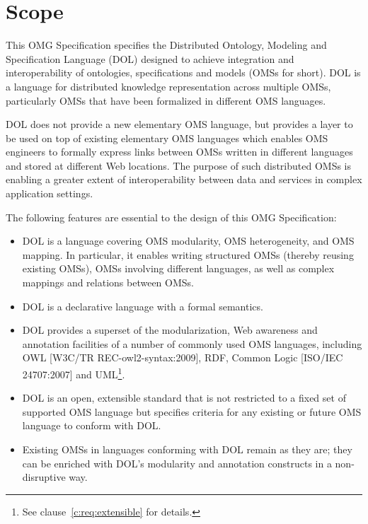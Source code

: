\documentclass[10pt,%
\ifpretendfinal
final%
\else
draft%
\fi,
]{scrreprt}
\newcommand*{\nitem}[1]{[#1]}
\newcommand*{\IS}{OMG Specification\xspace}
\newcommand{\clauserefname}{clause}
\newcommand{\cref}[1]{\clauserefname~\ref{#1}}
\begin{document}
\chapter{Scope}
This \IS specifies the Distributed Ontology, Modeling and Specification Language (DOL) designed to achieve integration and interoperability of ontologies, specifications and models (OMSs for short). DOL is a language for distributed knowledge representation across multiple OMSs, particularly OMSs that have been formalized in different OMS languages.

DOL does not provide a new elementary OMS language, but provides a
layer to be used on top of existing elementary OMS languages which
enables OMS engineers to formally express links between OMSs written
in different languages and stored at different Web locations. The
purpose of such distributed OMSs is enabling a greater extent of
interoperability between data and services in complex application
settings.

The following features are essential to the design of this \IS:

\begin{itemize}
\item DOL is a language covering OMS modularity, OMS heterogeneity, and
OMS mapping. In particular, it enables writing structured OMSs
(thereby reusing existing OMSs), OMSs involving different languages,
as well as complex mappings and relations between OMSs.
\item DOL is a declarative language with a formal semantics.
\item DOL provides a superset of the modularization, Web awareness and annotation facilities of a number of commonly used OMS languages, including OWL \nitem{W3C/TR REC-owl2-syntax:2009}, RDF, Common Logic \nitem{ISO/IEC 24707:2007} and UML\footnote{See \cref{c:req:extensible} for details.}.
\item DOL is an open, extensible standard that is not restricted to a fixed set of supported OMS language but specifies criteria for any existing or future OMS language to conform with DOL.
\item Existing OMSs in languages conforming with DOL remain as they are; they can be enriched with DOL's modularity and annotation constructs in a non-disruptive way.
\end{itemize}
\end{document}
